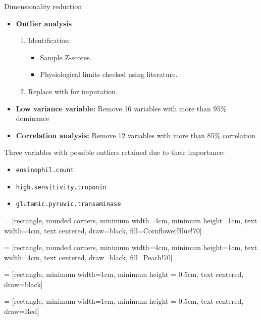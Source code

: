 \documentclass[aspectratio=169,xcolor=dvipsnames]{beamer}
\begin{document}

\begin{frame}{Dimensionality reduction}
\begin{itemize}
    \item \textbf{Outlier analysis}
    \begin{enumerate}
        \item Identification:
            \begin{itemize}
                \item Sample Z-scores.
                \item Physiological limits checked using literature.
            \end{itemize}
        \item Replace with  for imputation.
    \end{enumerate}
    \pause
    \item \textbf{Low variance variable:}
    Remove \alert{16} variables with more than \alert{95\% dominance}
    \pause
    \item \textbf{Correlation analysis:}
    Remove \alert{12} variables with more than \alert{85\% correlation}
\end{itemize}
\pause
Three variables with possible outliers retained due to their importance:
\begin{itemize}
    \item \texttt{eosinophil.count}
    \item \texttt{high.sensitivity.troponin}
    \item \texttt{glutamic.pyruvic.transaminase}
\end{itemize}

\end{frame}
 = [rectangle, rounded corners, 
minimum width=4cm, 
minimum height=1cm,
text width=4cm,
text centered, 
draw=black, 
fill=CornflowerBlue!70]

 = [rectangle, rounded corners, 
minimum width=4cm, 
minimum height=1cm,
text width=4cm,
text centered, 
draw=black, 
fill=Peach!70]

 = [rectangle, 
minimum width=1cm, 
minimum height = 0.5cm,
text centered, 
draw=black]

 = [rectangle, 
minimum width=1cm, 
minimum height = 0.5cm,
text centered, 
draw=Red]
\end{document}
